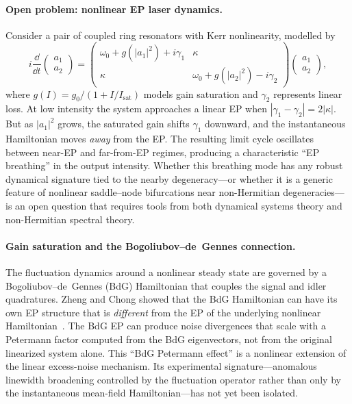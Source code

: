\paragraph{Open problem: nonlinear EP laser dynamics.}
Consider a pair of coupled ring resonators with Kerr nonlinearity,
modelled by
\begin{equation}
 i\frac{\dd}{\dd t}
 \begin{pmatrix} a_1 \\ a_2 \end{pmatrix}
 =
 \begin{pmatrix}
 \omega_0 + g(|a_1|^2) + i\gamma_1 & \kappa \\
 \kappa & \omega_0 + g(|a_2|^2) - i\gamma_2
 \end{pmatrix}
 \begin{pmatrix} a_1 \\ a_2 \end{pmatrix},
 \label{eq:nonlinear-ep-laser}
\end{equation}
where $g(I) = g_0/(1 + I/I_{\mathrm{sat}})$ models gain saturation
and $\gamma_2$ represents linear loss. At low intensity the system
approaches a linear EP when $|\gamma_1 - \gamma_2| = 2|\kappa|$. But
as $|a_1|^2$ grows, the saturated gain shifts $\gamma_1$ downward,
and the instantaneous Hamiltonian moves \emph{away} from the EP.
The resulting limit cycle oscillates between near-EP and far-from-EP
regimes, producing a characteristic ``EP breathing'' in the output
intensity. Whether this breathing mode has any robust dynamical
signature tied to the nearby degeneracy---or whether it is a generic
feature of nonlinear saddle--node bifurcations near non-Hermitian
degeneracies---is an open question that requires tools from both
dynamical systems theory and non-Hermitian spectral theory.

\paragraph{Gain saturation and the Bogoliubov--de~Gennes connection.}
The fluctuation dynamics around a nonlinear steady state are governed by
a Bogoliubov--de~Gennes (BdG) Hamiltonian that couples the signal and
idler quadratures. Zheng and Chong showed that the BdG Hamiltonian can
have its own EP structure that is \emph{different} from the EP of the
underlying nonlinear Hamiltonian~\cite{zheng2024noise}. The BdG EP can
produce noise divergences that scale with a Petermann factor computed
from the BdG eigenvectors, not from the original linearized system
alone. This ``BdG Petermann effect'' is a nonlinear extension of the
linear excess-noise mechanism. Its experimental signature---anomalous
linewidth broadening controlled by the fluctuation operator rather than
only by the instantaneous mean-field Hamiltonian---has not yet been
isolated.


